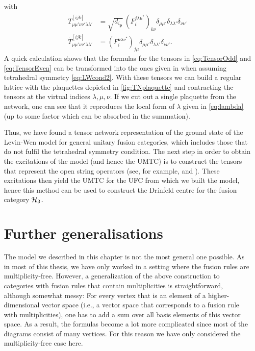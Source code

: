 with
\begin{align}
\label{eq:TensorOdd}
T_{\mu\mu'\nu\nu'\lambda\lambda'}^{[ijk]}&=\sqrt{d_{i_\mathbf{p}}}\ \overline{\left(F_i^{j\lambda\mu^*}\right)}_{k\nu}\delta_{\mu\mu'}\delta_{\lambda\lambda'}\delta_{\nu\nu'}\\
\label{eq:TensorEven}
\tilde{T}_{\mu\mu'\nu\nu'\lambda\lambda'}^{[ijk]}&=\left(F_i^{k\lambda\nu^*}\right)_{j\mu}\delta_{\mu\mu'}\delta_{\lambda\lambda'}\delta_{\nu\nu'}.
\end{align}
A quick calculation shows that the formulas for the tensors in \cref{eq:TensorOdd} and \cref{eq:TensorEven} can be transformed into the ones given in \cite{Buerschaper2009} when assuming tetrahedral symmetry \cref{eq:LWcond2}.
With these tensors we can build a regular lattice with the plaquettes depicted in \cref{fig:TNplaquette} and contracting the tensors at the virtual indices $\lambda,\mu,\nu$. If we cut out a single plaquette from the network, one can see that it reproduces the local form of $\lambda$ given in \cref{eq:lambda} (up to some factor which can be absorbed in the summation).

Thus, we have found a tensor network representation of the ground state of the Levin-Wen model for general unitary fusion categories, which includes those that do not fulfil the tetrahedral symmetry condition. The next step in order to obtain the excitations of the model (and hence the UMTC) is to construct the tensors that represent the open string operators (see, for example, \cite{Bultinck2017} and \cite{Williamson2017}). These excitations then yield the UMTC for the UFC from which we built the model, hence this method can be used to construct the Drinfeld centre for the fusion category ${\mathcal{H}_3}$.



\section{Further generalisations}

The model we described in this chapter is not the most general one possible. As in most of this thesis, we have only worked in a setting where the fusion rules are multiplicity-free. However, a generalization of the above construction to categories with fusion rules that contain multiplicities is straightforward, although somewhat messy: For every vertex that is an element of a higher-dimensional vector space (i.e., a vector space that corresponds to a fusion rule with multiplicities), one has to add a sum over all basis elements of this vector space. As a result, the formulas become a lot more complicated since most of the diagrams consist of many vertices. For this reason we have only considered the multiplicity-free case here.


